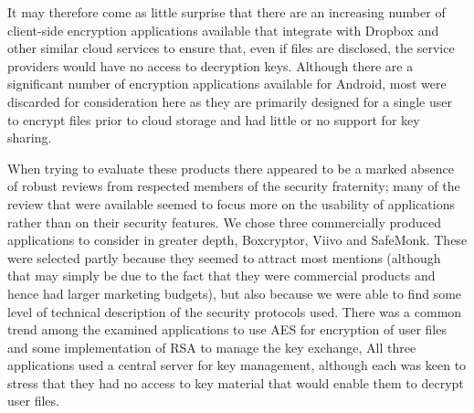 It may therefore come as little surprise that there are an increasing  number of client-side encryption applications available that  integrate with Dropbox and other similar cloud services  to ensure that, even if files are disclosed, the service providers would have no access to decryption keys.
Although there are a significant number of encryption applications available for Android, most were discarded for consideration here as they are primarily designed for a single user to encrypt files prior to cloud storage and had little or no support for key sharing.  

When trying to evaluate these products there appeared to be a marked absence of robust reviews from respected members of the security fraternity; many of the review that were available seemed to focus more on the usability of applications rather than on their security features.  We chose three commercially produced applications to consider in greater depth, Boxcryptor, Viivo and SafeMonk.  These were selected partly because they seemed to attract most mentions (although that may simply be due to the fact that they were commercial products and hence had larger marketing budgets), but also because we were able to find some level of technical description of the security protocols used.  There was a common trend among the examined applications to use AES for encryption of user files and some implementation of RSA to manage the key exchange, All three applications used a central server  for key management, although each was keen to stress that they had no access to key material that would enable them to decrypt user files. 

\\

\\




